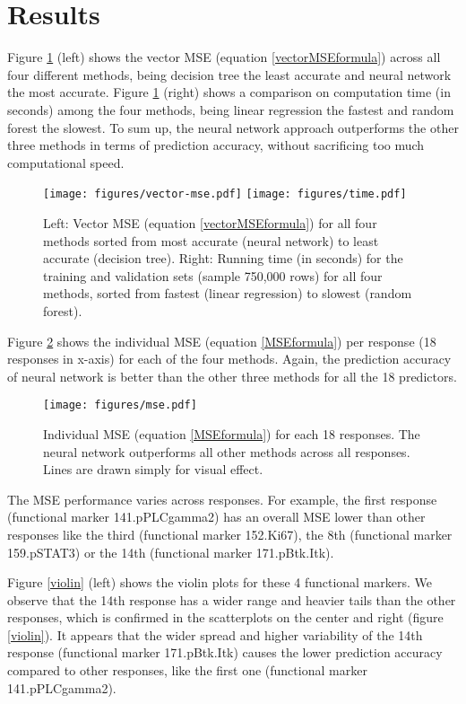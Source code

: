 \documentclass[conference]{IEEEtran}
\begin{document}
\section{Results}

Figure \ref{vectorMSE} (left) shows the vector MSE (equation
\ref{vectorMSEformula}) across all four different methods, being
decision tree the least accurate and neural network the most
accurate. Figure \ref{vectorMSE} (right) shows a comparison on
computation time (in seconds) among the four methods, being linear
regression the fastest and random forest the slowest. To sum up, the
neural network approach outperforms the other three methods in terms
of prediction accuracy, without sacrificing too much computational
speed.


\begin{figure}
\centering
\texttt{[image: figures/vector-mse.pdf]}
\texttt{[image: figures/time.pdf]}
\caption{Left: Vector MSE (equation \ref{vectorMSEformula}) for all
  four methods sorted from most accurate (neural network) to least
  accurate (decision tree). Right: Running time (in seconds) for the
  training and validation sets (sample 750,000 rows) for all four
  methods, sorted from fastest (linear regression) to slowest (random
  forest).}
\label{vectorMSE}
\end{figure}


Figure \ref{MSE} shows the individual MSE (equation \ref{MSEformula})
per response (18 responses in x-axis) for each of the four
methods. Again, the prediction accuracy of neural network is better
than the other three methods for all the 18 predictors.

\begin{figure}
\centering
\texttt{[image: figures/mse.pdf]}
\caption{Individual MSE (equation \ref{MSEformula}) for each 18
  responses. The neural network outperforms all other methods across
  all responses.  Lines are drawn simply for visual effect.}
\label{MSE}
\end{figure}

The MSE performance varies across responses. For example, the first response (functional marker 141.pPLCgamma2) has an overall MSE lower than other responses like the third (functional marker 152.Ki67), the 8th (functional marker 159.pSTAT3) or the 14th (functional marker 171.pBtk.Itk).

Figure \ref{violin} (left) shows the violin plots for these 4 functional markers. We observe that the 14th response has a wider range and heavier tails than the other responses, which is confirmed in the scatterplots on the center and right (figure \ref{violin}). It appears that the wider spread and higher variability of the 14th response (functional marker 171.pBtk.Itk) causes the lower prediction accuracy compared to other responses, like the first one (functional marker 141.pPLCgamma2).
\end{document}
